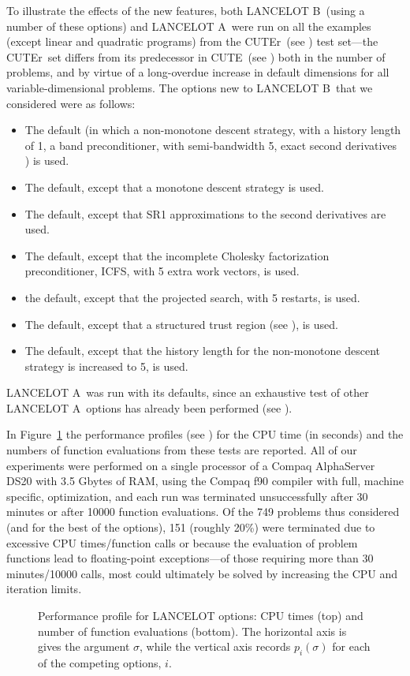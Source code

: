 \documentclass[twoside]{article}
\newcommand{\lana}{{\sf LANCELOT A}}
\newcommand{\lanb}{{\sf LANCELOT B}}
\newcommand{\cute}{{\sf CUTE}}
\newcommand{\cuter}{{\sf CUTEr}}
\begin{document}
To illustrate the effects of the new features, 
both \lanb\ (using a number of these options) and \lana\
were run on all the examples (except linear and quadratic programs) from
the \cuter\ (see \bciteb{GoulOrbaToin02b})
test set---the \cuter\ set differs from its predecessor
in \cute\ (see )
both in the number of problems, and by virtue of a long-overdue
increase in default dimensions for all variable-dimensional problems.  
The options new to \lanb\ that we considered were as follows:
\begin{itemize}
\item The default (in which a non-monotone descent strategy, with a
history length of 1, a band preconditioner, with semi-bandwidth 5, exact second
derivatives ) is used.
\item The default, except that a monotone descent strategy is used.
\item The default, except that SR1 approximations to the second derivatives
are used.
\item The default, except that the  incomplete Cholesky 
   factorization preconditioner, ICFS, with 5 extra work vectors, is used.
\item the default, except that the \citebb{MoreTora91} projected search,
with 5 restarts, is used.
\item The default, except that a structured trust region
   (see ), is used.
\item The default, except that the history length for the 
non-monotone descent strategy is increased to 5, is used.
\end{itemize}
\lana\ was run with its defaults, since an exhaustive test
of other \lana\ options has already been performed 
(see ).

In Figure~\ref{prof.ps}
the performance profiles (see ) for the CPU time
(in seconds) and the numbers of function evaluations  
from these tests are reported. All of our experiments were performed 
on a single processor of a Compaq AlphaServer DS20 with 3.5 Gbytes of RAM,
using the Compaq f90 compiler with full, machine specific, optimization,
and each run was terminated unsuccessfully after 30 minutes or after 10000
function evaluations.
Of the 749 problems thus considered (and for the best of the 
options), 151 (roughly 20\%) 
were terminated due to excessive CPU times/function calls or because
the evaluation of problem functions lead to floating-point exceptions---of
those requiring more than 30 minutes/10000 calls, most could ultimately 
be solved by increasing the CPU and iteration limits.
\begin{figure}[htbp]
\centerline{
}\centerline{
            }
\caption{Performance profile for LANCELOT options: CPU times (top)
and number of function evaluations (bottom). The horizontal axis is
gives the argument $\sigma$, while the vertical axis records $p_i(\sigma)$ 
for each of the competing options, $i$.}
\label{prof.ps}
\end{figure}
\end{document}
